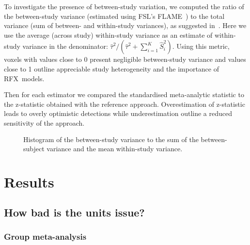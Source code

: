 \documentclass[preprint,12pt]{elsarticle}
\newcommand{\vareffect}[1][i]{\hat S^2_{#1}}
\newcommand{\nStudies}{K}
\newcommand{\estvarBetween}{\hat\tau^2}
\begin{document}




To investigate the presence of between-study variation, we computed the ratio of the between-study variance (estimated using FSL's FLAME~\cite{Smith2001}) to the total variance (sum of between- and within-study variances), as suggested in~\cite{Chen2012}. Here we use the average (across study) within-study variance as an estimate of within-study variance in the denominator:
$\estvarBetween / (\estvarBetween + \sum_{i=1}^{\nStudies} \vareffect)$.
Using this metric, voxels with values close to 0 present negligible between-study variance and values close to 1 outline appreciable study heterogeneity and the importance of RFX~models.

Then for each estimator we compared the standardised meta-analytic statistic to the z-statistic obtained with the reference approach. Overestimation of z-statistic leads to overly optimistic detections while underestimation outline a reduced sensitivity of the approach. 

\begin{figure}[t]
	\centering
	\caption{Histogram of the between-study variance to the sum of the between-subject variance and the mean within-study variance.}
	\label{fig_realdata_variances}
\end{figure}

\section{Results}\label{sec_res}

\subsection{How bad is the units issue?}

\subsubsection{Group meta-analysis}
\end{document}
